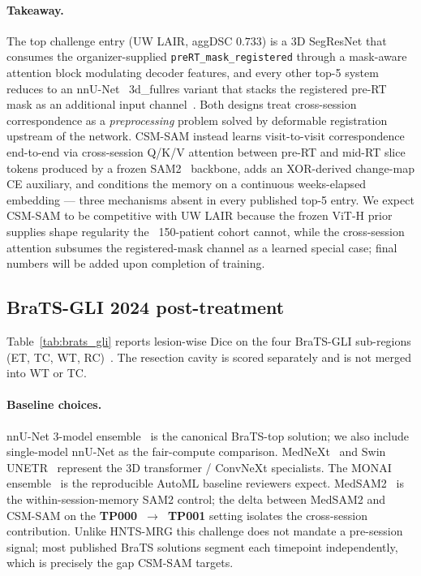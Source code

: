 \paragraph{Takeaway.} The top challenge entry (UW LAIR, aggDSC
$0.733$) is a 3D SegResNet that consumes the organizer-supplied
\texttt{preRT\_mask\_registered} through a mask-aware attention block
modulating decoder features, and every other top-5 system reduces
to an nnU-Net~\cite{isensee2021nnunet} 3d\_fullres variant that
stacks the registered pre-RT mask as an additional input
channel~\cite{wahid2024hntsmrg}. Both designs treat cross-session
correspondence as a \emph{preprocessing} problem solved by deformable
registration upstream of the network. CSM-SAM instead learns
visit-to-visit correspondence end-to-end via cross-session Q/K/V
attention between pre-RT and mid-RT slice tokens produced by a frozen
SAM2~\cite{ravi2024sam2} backbone, adds an XOR-derived change-map CE
auxiliary, and conditions the memory on a continuous weeks-elapsed
embedding --- three mechanisms absent in every published top-5 entry.
We expect CSM-SAM to be competitive with UW LAIR because the frozen
ViT-H prior supplies shape regularity the ~150-patient cohort cannot,
while the cross-session attention subsumes the registered-mask channel
as a learned special case; final numbers will be added upon completion
of training.

\subsection{BraTS-GLI 2024 post-treatment}
\label{sec:results_brats}

Table~\ref{tab:brats_gli} reports lesion-wise Dice on the four BraTS-GLI
sub-regions (ET, TC, WT, RC)~\cite{delarosa2024brats}. The
resection cavity is scored separately and is not merged into WT or TC.


\paragraph{Baseline choices.} nnU-Net 3-model ensemble~\cite{isensee2021nnunet}
is the canonical BraTS-top solution; we also include single-model
nnU-Net as the fair-compute comparison. MedNeXt~\cite{roy2023mednext}
and Swin UNETR~\cite{hatamizadeh2021swinunetr} represent the 3D
transformer / ConvNeXt specialists. The MONAI
ensemble~\cite{cardoso2022monai} is the reproducible AutoML baseline
reviewers expect. MedSAM2~\cite{ma2024medsam2} is the
within-session-memory SAM2 control; the delta between MedSAM2 and
CSM-SAM on the \textbf{TP000~$\to$~TP001} setting isolates the
cross-session contribution. Unlike HNTS-MRG this challenge does not
mandate a pre-session signal; most published BraTS solutions segment
each timepoint independently, which is precisely the gap CSM-SAM
targets.

